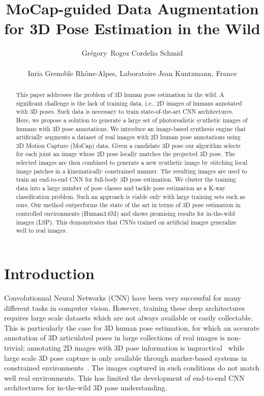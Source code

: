 \documentclass{article}
\title{MoCap-guided Data Augmentation \\for 3D Pose Estimation in the Wild}
\author{
  Gr\'egory~Rogez \qquad Cordelia Schmid \\ 
\vspace{-3mm}
\\  Inria  Grenoble  Rh\^one-Alpes,  Laboratoire  Jean  Kuntzmann,  France  
\vspace{-3mm}
}
\begin{document}
\maketitle
\vspace{-2mm}

\begin{abstract}
\vspace{-3mm}


This paper addresses the problem of 3D human pose estimation 
in the wild. A significant challenge is the lack of training data,
i.e., 2D images of humans annotated with 3D poses. Such 
data is necessary to train state-of-the-art CNN architectures. Here, we propose
a solution to generate a large set of photorealistic synthetic images
of humans with 3D pose annotations. We introduce an image-based synthesis engine that
artificially augments a dataset of real images with 2D human pose annotations 
using 3D Motion Capture (MoCap) data.
Given a candidate 3D pose our algorithm selects for each joint an
image whose 2D pose locally matches the projected 3D pose. The
selected images are then combined to generate a new synthetic image by
stitching local image patches in a kinematically constrained manner. 
The resulting images are used to train an
end-to-end CNN for full-body 3D pose estimation. We cluster the
training data into a 
large number of pose classes and tackle pose estimation as a K-way
classification problem. Such an approach is viable only with 
large training sets such as ours. Our method outperforms
the state of the art in terms of 3D pose estimation in controlled
environments (Human3.6M) and shows promising results for in-the-wild
images (LSP). This demonstrates that CNNs trained on artificial
images generalize well to real images. 



\end{abstract}

\vspace{-3mm}

\section{Introduction}

\vspace{-2mm}






Convolutionnal Neural Networks (CNN) have been very successful for
many different tasks in computer vision. However, training these deep
architectures requires large scale datasets which are not always
available or easily collectable. This is particularly the case for 3D
human pose estimation, for which an accurate annotation of 3D articulated poses in large collections of real images is non-trivial: annotating 2D images with 3D pose information is impractical~\cite{bourdev2009poselets} while large scale 3D pose capture is only available through marker-based systems in constrained environments~\cite{IonescuPOS14}. The images captured in such conditions do not match well real environments. This has limited the development of end-to-end CNN architectures for in-the-wild 3D pose understanding.
\end{document}
